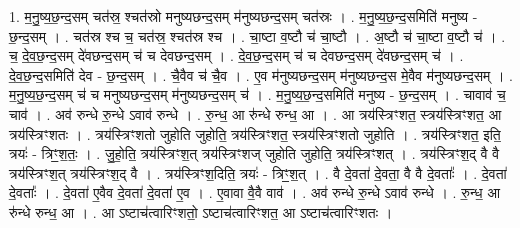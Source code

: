 \documentclass[17pt]{extarticle}
\begin{document}
1. म॒नु॒ष्य॒छ॒न्द॒सम् चत॑स्र॒ श्चत॑स्रो मनुष्यछन्द॒सम् म॑नुष्यछन्द॒सम् चत॑स्रः । . म॒नु॒ष्य॒छ॒न्द॒समिति॑ मनुष्य - छ॒न्द॒सम् । . चत॑स्र श्च च॒ चत॑स्र॒ श्चत॑स्र श्च । . चा॒ष्टा व॒ष्टौ च॑ चा॒ष्टौ । . अ॒ष्टौ च॑ चा॒ष्टा व॒ष्टौ च॑ । . च॒ दे॒व॒छ॒न्द॒सम् दे॑वछन्द॒सम् च॑ च देवछन्द॒सम् । . दे॒व॒छ॒न्द॒सम् च॑ च देवछन्द॒सम् दे॑वछन्द॒सम् च॑ । . दे॒व॒छ॒न्द॒समिति॑ देव - छ॒न्द॒सम् । . चै॒वैव च॑ चै॒व । . ए॒व म॑नुष्यछन्द॒सम् म॑नुष्यछन्द॒स मे॒वैव म॑नुष्यछन्द॒सम् । . म॒नु॒ष्य॒छ॒न्द॒सम् च॑ च मनुष्यछन्द॒सम् म॑नुष्यछन्द॒सम् च॑ । . म॒नु॒ष्य॒छ॒न्द॒समिति॑ मनुष्य - छ॒न्द॒सम् । . चावाव॑ च॒ चाव॑ । . अव॑ रुन्धे रु॒न्धे ऽवाव॑ रुन्धे । . रु॒न्ध॒ आ रु॑न्धे रुन्ध॒ आ । . आ त्रय॑स्त्रिꣳशत॒ स्त्रय॑स्त्रिꣳशत॒ आ त्रय॑स्त्रिꣳशतः । . त्रय॑स्त्रिꣳशतो जुहोति जुहोति॒ त्रय॑स्त्रिꣳशत॒ स्त्रय॑स्त्रिꣳशतो जुहोति । . त्रय॑स्त्रिꣳशत॒ इति॒ त्रयः॑ - त्रिꣳ॒॒श॒तः॒ । . जु॒हो॒ति॒ त्रय॑स्त्रिꣳश॒त् त्रय॑स्त्रिꣳशज् जुहोति जुहोति॒ त्रय॑स्त्रिꣳशत् । . त्रय॑स्त्रिꣳश॒द् वै वै त्रय॑स्त्रिꣳश॒त् त्रय॑स्त्रिꣳश॒द् वै । . त्रय॑स्त्रिꣳश॒दिति॒ त्रयः॑ - त्रिꣳ॒॒श॒त् । . वै दे॒वता॑ दे॒वता॒ वै वै दे॒वताः᳚ । . दे॒वता॑ दे॒वताः᳚ । . दे॒वता॑ ए॒वैव दे॒वता॑ दे॒वता॑ ए॒व । . ए॒वावा वै॒वै वाव॑ । . अव॑ रुन्धे रु॒न्धे ऽवाव॑ रुन्धे । . रु॒न्ध॒ आ रु॑न्धे रुन्ध॒ आ । . आ ऽष्टाच॑त्वारिꣳशतो॒ ऽष्टाच॑त्वारिꣳशत॒ आ ऽष्टाच॑त्वारिꣳशतः । \newline
\end{document}
